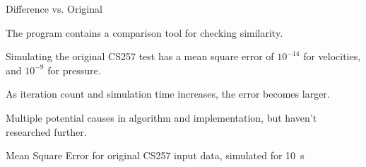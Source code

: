 \begin{frame}{Difference vs. Original}
    \begin{wideitemize}
        \item The program contains a comparison tool for checking similarity.
    
        \item Simulating the original CS257 test has a mean square error of $10^{-14}$ for velocities, and $10^{-9}$ for pressure. 
    
        \item As iteration count and simulation time increases, the error becomes larger.
        \item Multiple potential causes in algorithm and implementation, but haven't researched further.
    \end{wideitemize}
    
    \vfill\null
    
    \begin{center}
        Mean Square Error for original CS257 input data, simulated for \SI{10}{\second}
    \end{center}
\end{frame}




